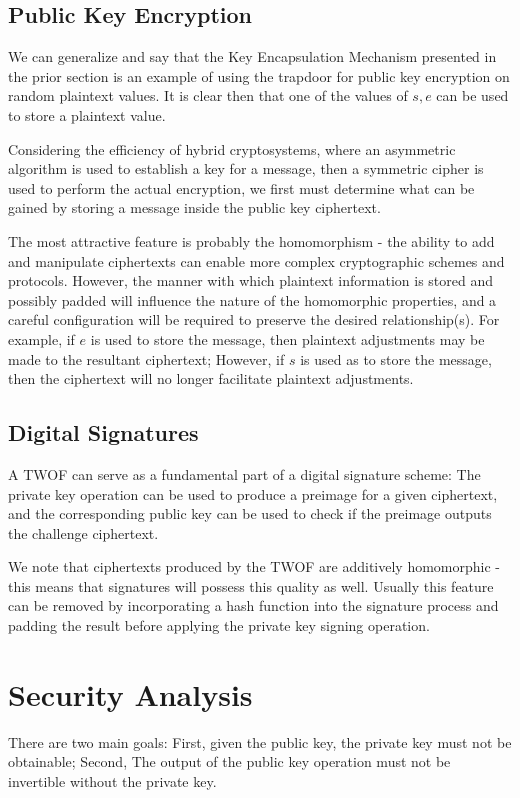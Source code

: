 \documentclass[preprint]{iacrtrans}
\begin{document}
\subsection{Public Key Encryption}
We can generalize and say that the Key Encapsulation Mechanism presented in the prior section is an example of using the trapdoor for public key encryption on random plaintext values. It is clear then that one of the values of $s, e$ can be used to store a plaintext value.

Considering the efficiency of hybrid cryptosystems, where an asymmetric algorithm is used to establish a key for a message, then a symmetric cipher is used to perform the actual encryption, we first must determine what can be gained by storing a message inside the public key ciphertext.

The most attractive feature is probably the homomorphism - the ability to add and manipulate ciphertexts can enable more complex cryptographic schemes and protocols. However, the manner with which plaintext information is stored and possibly padded will influence the nature of the homomorphic properties, and a careful configuration will be required to preserve the desired relationship(s). For example, if $e$ is used to store the message, then plaintext adjustments may be made to the resultant ciphertext; However, if $s$ is used as to store the message, then the ciphertext will no longer facilitate plaintext adjustments.

\subsection{Digital Signatures}
A TWOF can serve as a fundamental part of a digital signature scheme: The private key operation can be used to produce a preimage for a given ciphertext, and the corresponding public key can be used to check if the preimage outputs the challenge ciphertext. 

We note that ciphertexts produced by the TWOF are additively homomorphic - this means that signatures will possess this quality as well. Usually this feature can be removed by incorporating a hash function into the signature process and padding the result before applying the private key signing operation. 

\section{Security Analysis}
There are two main goals: First, given the public key, the private key must not be obtainable; Second, The output of the public key operation must not be invertible without the private key.
\end{document}
